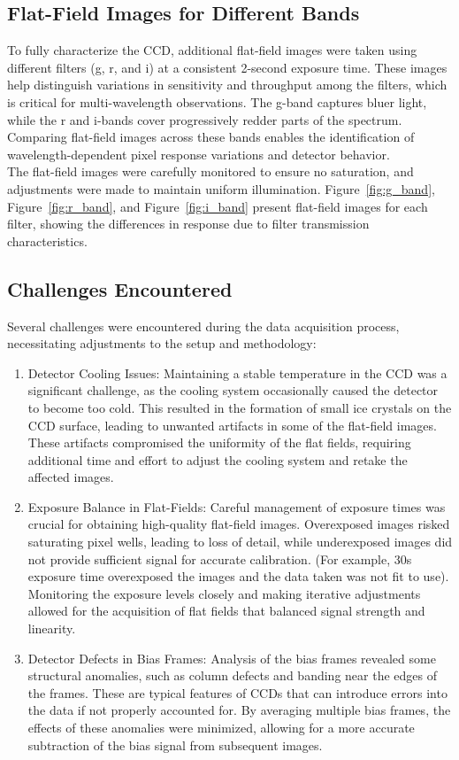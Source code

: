 \documentclass[linenumbers,twocolumn]{aastex631}
\begin{document}
\subsection{Flat-Field Images for Different Bands}
To fully characterize the CCD, additional flat-field images were taken using different filters (g, r, and i) at a consistent 2-second exposure time. These images help distinguish variations in sensitivity and throughput among the filters, which is critical for multi-wavelength observations. The g-band captures bluer light, while the r and i-bands cover progressively redder parts of the spectrum. Comparing flat-field images across these bands enables the identification of wavelength-dependent pixel response variations and detector behavior. \\

The flat-field images were carefully monitored to ensure no saturation, and adjustments were made to maintain uniform illumination. Figure~\ref{fig:g_band}, Figure~\ref{fig:r_band}, and Figure~\ref{fig:i_band} present flat-field images for each filter, showing the differences in response due to filter transmission characteristics.

\subsection{Challenges Encountered}
Several challenges were encountered during the data acquisition process, necessitating adjustments to the setup and methodology:
\begin{enumerate}
    \item Detector Cooling Issues: Maintaining a stable temperature in the CCD was a significant challenge, as the cooling system occasionally caused the detector to become too cold. This resulted in the formation of small ice crystals on the CCD surface, leading to unwanted artifacts in some of the flat-field images. These artifacts compromised the uniformity of the flat fields, requiring additional time and effort to adjust the cooling system and retake the affected images.
    \item Exposure Balance in Flat-Fields: Careful management of exposure times was crucial for obtaining high-quality flat-field images. Overexposed images risked saturating pixel wells, leading to loss of detail, while underexposed images did not provide sufficient signal for accurate calibration. (For example, 30s exposure time overexposed the images and the data taken was not fit to use). Monitoring the exposure levels closely and making iterative adjustments allowed for the acquisition of flat fields that balanced signal strength and linearity.
    \item Detector Defects in Bias Frames: Analysis of the bias frames revealed some structural anomalies, such as column defects and banding near the edges of the frames. These are typical features of CCDs that can introduce errors into the data if not properly accounted for. By averaging multiple bias frames, the effects of these anomalies were minimized, allowing for a more accurate subtraction of the bias signal from subsequent images.
\end{enumerate}
\end{document}
